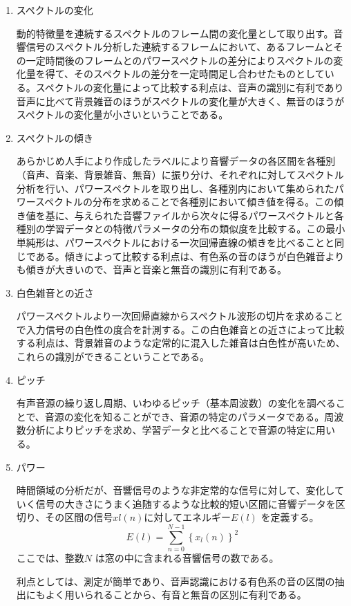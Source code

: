 \begin{enumerate}
\item スペクトルの変化\par
動的特徴量を連続するスペクトルのフレーム間の変化量として取り出す。音響信号のスペクトル分析した連続するフレームにおいて、あるフレームとその一定時間後のフレームとのパワースペクトルの差分によりスペクトルの変化量を得て、そのスペクトルの差分を一定時間足し合わせたものとしている。スペクトルの変化量によって比較する利点は、音声の識別に有利であり音声に比べて背景雑音のほうがスペクトルの変化量が大きく、無音のほうがスペクトルの変化量が小さいということである。

\item スペクトルの傾き\par
あらかじめ人手により作成したラベルにより音響データの各区間を各種別（音声、音楽、背景雑音、無音）に振り分け、それぞれに対してスペクトル分析を行い、パワースペクトルを取り出し、各種別内において集められたパワースペクトルの分布を求めることで各種別において傾き値を得る。この傾き値を基に、与えられた音響ファイルから次々に得るパワースペクトルと各種別の学習データとの特徴パラメータの分布の類似度を比較する。この最小単純形は、パワースペクトルにおける一次回帰直線の傾きを比べることと同じである。傾きによって比較する利点は、有色系の音のほうが白色雑音よりも傾きが大きいので、音声と音楽と無音の識別に有利である。

\item 白色雑音との近さ\par
パワースペクトルより一次回帰直線からスペクトル波形の切片を求めることで入力信号の白色性の度合を計測する。この白色雑音との近さによって比較する利点は、背景雑音のような定常的に混入した雑音は白色性が高いため、これらの識別ができるこということである。

\item ピッチ\par
有声音源の繰り返し周期、いわゆるピッチ（基本周波数）の変化を調べることで、音源の変化を知ることができ、音源の特定のパラメータである。周波数分析によりピッチを求め、学習データと比べることで音源の特定に用いる。

\item パワー\par
時間領域の分析だが、音響信号のような非定常的な信号に対して、変化していく信号の大きさにうまく追随するような比較的短い区間に音響データを区切り、その区間の信号$xl(n)$に対してエネルギー$E(l)$ を定義する\cite{shimae_11}。
\begin{equation}
E(l)=\sum_{n=0}^{N-1}\left\{x_l(n)\right\}^2
\end{equation}
ここでは、整数$N$ は窓の中に含まれる音響信号の数である。\par
利点としては、測定が簡単であり、音声認識における有色系の音の区間の抽出にもよく用いられることから、有音と無音の区別に有利である。


\end{enumerate}
